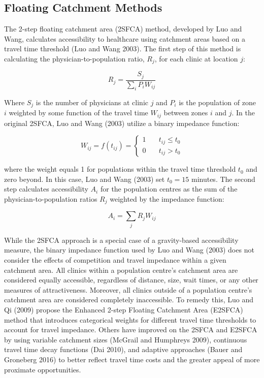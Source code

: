 \documentclass{article}
\begin{document}
\hypertarget{floating-catchment-methods}{%
\subsection{Floating Catchment
Methods}\label{floating-catchment-methods}}

The 2-step floating catchment area (2SFCA) method, developed by Luo and
Wang, calculates accessibility to healthcare using catchment areas based
on a travel time threshold (Luo and Wang 2003). The first step of this
method is calculating the physician-to-population ratio, \(R_j\), for
each clinic at location \(j\):

\[
R_j = \frac{S_j}{\sum_i{P_iW_{ij}}}
\]

Where \(S_j\) is the number of physicians at clinic \(j\) and \(P_i\) is
the population of zone \(i\) weighted by some function of the travel
time \(W_{ij}\) between zones \(i\) and \(j\). In the original 2SFCA,
Luo and Wang (2003) utilize a binary impedance function:

\[
W_{ij} = f(t_{ij}) = \left\{
        \begin{array}{ll}
            1 & \quad t_{ij} \leq t_0 \\
            0 & \quad t_{ij} > t_0
        \end{array}
    \right.
\]

where the weight equals 1 for populations within the travel time
threshold \(t_0\) and zero beyond. In this case, Luo and Wang (2003) set
\(t_0 = 15\) minutes. The second step calculates accessibility \(A_i\)
for the population centres as the sum of the physician-to-population
ratios \(R_j\) weighted by the impedance function:

\[
A_i = \sum_j{R_jW_{ij}}
\]

While the 2SFCA approach is a special case of a gravity-based
accessibility measure, the binary impedance function used by Luo and
Wang (2003) does not consider the effects of competition and travel
impedance within a given catchment area. All clinics within a population
centre's catchment area are considered equally accessible, regardless of
distance, size, wait times, or any other measures of attractiveness.
Moreover, all clinics outside of a population centre's catchment area
are considered completely inaccessible. To remedy this, Luo and Qi
(2009) propose the Enhanced 2-step Floating Catchment Area (E2SFCA)
method that introduces categorical weights for different travel time
thresholds to account for travel impedance. Others have improved on the
2SFCA and E2SFCA by using variable catchment sizes (McGrail and
Humphreys 2009), continuous travel time decay functions (Dai 2010), and
adaptive approaches (Bauer and Groneberg 2016) to better reflect travel
time costs and the greater appeal of more proximate opportunities.
\end{document}
